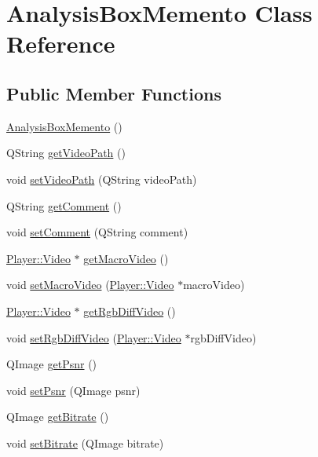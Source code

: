 \hypertarget{classAnalysisBoxMemento}{}\section{Analysis\+Box\+Memento Class Reference}
\label{classAnalysisBoxMemento}
\subsection*{Public Member Functions}
\begin{DoxyCompactItemize}
\item 
\hyperlink{classAnalysisBoxMemento_a2891757dd897d8d7e04f6ac721863e30}{Analysis\+Box\+Memento} ()
\item 
Q\+String \hyperlink{classAnalysisBoxMemento_a0aee21e65efbd5059679492dcb847281}{get\+Video\+Path} ()
\item 
void \hyperlink{classAnalysisBoxMemento_a3db0ccff589bc23a3226a0ac59857437}{set\+Video\+Path} (Q\+String video\+Path)
\item 
Q\+String \hyperlink{classAnalysisBoxMemento_a8475ee6c96bf1157aa07530f9100416c}{get\+Comment} ()
\item 
void \hyperlink{classAnalysisBoxMemento_ab3a897eff60f58840c8d1b40292cf047}{set\+Comment} (Q\+String comment)
\item 
\hyperlink{classPlayer_1_1Video}{Player\+::\+Video} $\ast$ \hyperlink{classAnalysisBoxMemento_a5cfca0e511554cab828cb883248735a6}{get\+Macro\+Video} ()
\item 
void \hyperlink{classAnalysisBoxMemento_ae9c2a85abaf50897a79d76933cf4d784}{set\+Macro\+Video} (\hyperlink{classPlayer_1_1Video}{Player\+::\+Video} $\ast$macro\+Video)
\item 
\hyperlink{classPlayer_1_1Video}{Player\+::\+Video} $\ast$ \hyperlink{classAnalysisBoxMemento_a7332e1f19bae3be51ad3c558559ab785}{get\+Rgb\+Diff\+Video} ()
\item 
void \hyperlink{classAnalysisBoxMemento_a55191c2729f15401ad5d16b81ffdeeea}{set\+Rgb\+Diff\+Video} (\hyperlink{classPlayer_1_1Video}{Player\+::\+Video} $\ast$rgb\+Diff\+Video)
\item 
Q\+Image \hyperlink{classAnalysisBoxMemento_a581aa3ebb51a9ce69dcbe21d6f949e99}{get\+Psnr} ()
\item 
void \hyperlink{classAnalysisBoxMemento_a5613ac52b106bb5859856712c3a3279f}{set\+Psnr} (Q\+Image psnr)
\item 
Q\+Image \hyperlink{classAnalysisBoxMemento_a0b8e4c45925b9a6f85c327561d7a4369}{get\+Bitrate} ()
\item 
void \hyperlink{classAnalysisBoxMemento_ad755ae317fc096de20872b5daf21d69d}{set\+Bitrate} (Q\+Image bitrate)
\end{DoxyCompactItemize}


